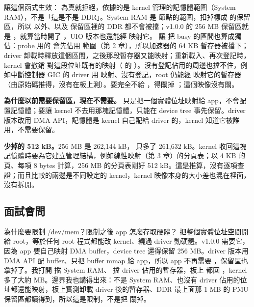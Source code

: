  讓這個函式生效： 為真就拒絕，依據的是 kernel 管理的記憶體範圍（System RAM），不是「這是不是 DDR」。System RAM 是  節點的範圍，扣掉標成  的保留區，所以  以外、以及  保留區裡的 DDR 都不會被擋；v1.0.0 的 256 MB 保留區就是 ，就算當時開了 ，UIO 版本也還能經  映射它。 讓  把 busy 的區間也算成獨佔：probe 用的  會先佔用  範圍（第 2 章），所以加速器的 64 KB 暫存器被擋下；driver 卸載時釋放這個區間，之後那段暫存器又能映射；重新載入、再次登記時，kernel 會撤銷  對這段位址既有的映射（ 的 ）。沒有登記佔用的周邊也擋不住，例如中斷控制器 GIC 的 driver 用  映射、沒有登記，root 仍能經  映射它的暫存器（由原始碼推得，沒有在板上測）。要完全不給 ，得關掉 ；這個映像沒有關。

\textbf{為什麼以前需要保留區，現在不需要。} 只是把一個實體位址映射給 app，不會配置記憶體；要讓 kernel 不去用那塊記憶體，只能在 device tree 事先保留。driver 版本改用 DMA API，記憶體是 kernel 自己配給 driver 的，kernel 知道它被誰用，不需要保留。

\textbf{少掉的 512 kB。}256 MB 是 262,144 kB， 只多了 261,632 kB。kernel 收回這塊記憶體時要為它建立管理結構，例如線性映射（第 3 章）的分頁表；以 4 KB 的頁、每項 8 bytes 計算，256 MB 的分頁表剛好 512 kB。這是推算，沒有逐項查證；而且比較的兩邊是不同設定的 kernel，kernel 映像本身的大小差也混在裡面，沒有拆開。

\subsection{面試會問}

\begin{qa}{為什麼要限制 /dev/mem？限制之後 app 怎麼存取硬體？}
 把整個實體位址空間開給 root，等於任何 root 程式都能改 kernel、繞過 driver 動硬體。v1.0.0 需要它，因為 app 要自己映射 DMA buffer，device tree 還得保留 256 MB。driver 版本用 DMA API 配 buffer、只把 buffer mmap 給 app，所以 app 不再需要 ，保留區也拿掉了。我打開  擋 System RAM、 擋 driver 佔用的暫存器，板上  都回 ，kernel 多了大約 \memGainMB{} MB。邊界我也講得出來：不是 System RAM、也沒有 driver 佔用的位址都還能映射，板上實測卸載 driver 後的暫存器、DDR 最上面那 1 MB 的 PMU 保留區都讀得到，所以這是限制，不是把  關掉。
\end{qa}

